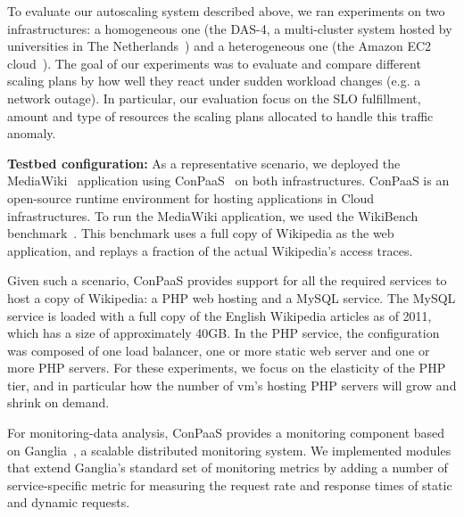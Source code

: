 To evaluate our autoscaling system described above, we ran experiments
on two infrastructures: a homogeneous one (the DAS-4, a multi-cluster system
hosted by universities in The Netherlands~\cite{das4}) and a heterogeneous
one (the Amazon EC2 cloud~\cite{amazonEC2}). The goal of our experiments
was to evaluate and compare different scaling plans by how well they react under sudden
workload changes (e.g. a network outage). In particular, our evaluation focus on
the SLO fulfillment, amount and type of resources the scaling plans allocated to handle
this traffic anomaly. 



\textbf{Testbed configuration:}  As a representative scenario, we deployed the MediaWiki~\cite{mediawiki} application using ConPaaS~\cite{conpaasIC} on both infrastructures. ConPaaS is an open-source runtime environment for hosting applications in Cloud infrastructures. To run the MediaWiki application, we used the WikiBench benchmark~\cite{wikibench}. This benchmark uses a full copy of Wikipedia as the web application, and replays a fraction of the actual Wikipedia's access traces. 

Given such a scenario, ConPaaS provides support for all the required services to host a copy of Wikipedia: a PHP web hosting and a MySQL service. The MySQL service is loaded with a full copy of the English Wikipedia articles as of 2011, which has a size of approximately 40GB.  In the PHP service, the configuration was composed of one load balancer, one or more static web server and one or more PHP servers. For these experiments, we focus on the elasticity of the PHP tier, and in particular how the number of vm's hosting PHP servers will grow and shrink on demand.

For monitoring-data analysis, ConPaaS provides a monitoring component based on Ganglia~\cite{ganglia}, a scalable distributed monitoring system. We implemented modules that extend Ganglia's standard set of monitoring metrics by adding a number of service-specific metric for measuring the request rate and response times of static and dynamic requests.

